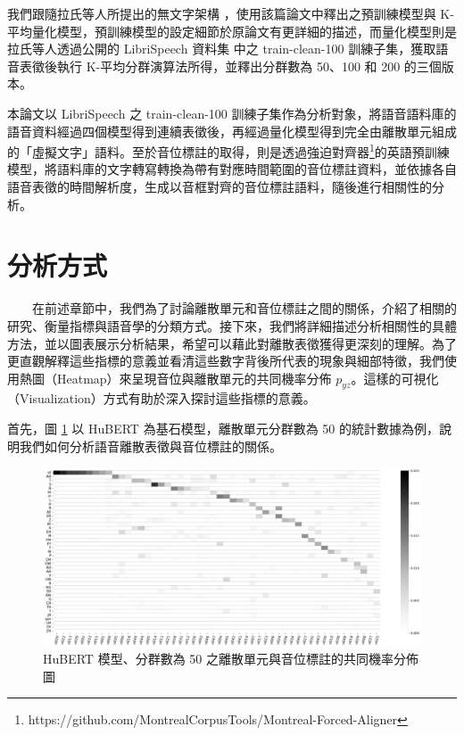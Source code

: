         我們跟隨拉氏等人所提出的無文字架構 \cite{lakhotia_generative_2021-1} ，使用該篇論文中釋出之預訓練模型與 K-平均量化模型，預訓練模型的設定細節於原論文有更詳細的描述，而量化模型則是拉氏等人透過公開的 LibriSpeech 資料集 \cite{panayotov_librispeech_2015} 中之 train-clean-100 訓練子集，獲取語音表徵後執行 K-平均分群演算法所得，並釋出分群數為 50、100 和 200 的三個版本。

        本論文以 LibriSpeech 之 train-clean-100 訓練子集作為分析對象，將語音語料庫的語音資料經過四個模型得到連續表徵後，再經過量化模型得到完全由離散單元組成的「虛擬文字」語料。至於音位標註的取得，則是透過強迫對齊器\footnote{https://github.com/MontrealCorpusTools/Montreal-Forced-Aligner}的英語預訓練模型，將語料庫的文字轉寫轉換為帶有對應時間範圍的音位標註資料，並依據各自語音表徵的時間解析度，生成以音框對齊的音位標註語料，隨後進行相關性的分析。




\section{分析方式}          %

　　在前述章節中，我們為了討論離散單元和音位標註之間的關係，介紹了相關的研究、衡量指標與語音學的分類方式。接下來，我們將詳細描述分析相關性的具體方法，並以圖表展示分析結果，希望可以藉此對離散表徵獲得更深刻的理解。為了更直觀解釋這些指標的意義並看清這些數字背後所代表的現象與細部特徵，我們使用熱圖（Heatmap）來呈現音位與離散單元的共同機率分佈 \(p_{yz}\)。這樣的可視化（Visualization）方式有助於深入探討這些指標的意義。

        首先，圖 \ref{fig:hubert-50-joint-byprob} 以 HuBERT 為基石模型，離散單元分群數為 50 的統計數據為例，說明我們如何分析語音離散表徵與音位標註的關係。

\begin{figure}
    \centering
    \includegraphics[width=1\linewidth]{figures/hubert-50-joint-byprob.png}
    \caption{HuBERT 模型、分群數為 50 之離散單元與音位標註的共同機率分佈圖}
    \label{fig:hubert-50-joint-byprob}
\end{figure}


